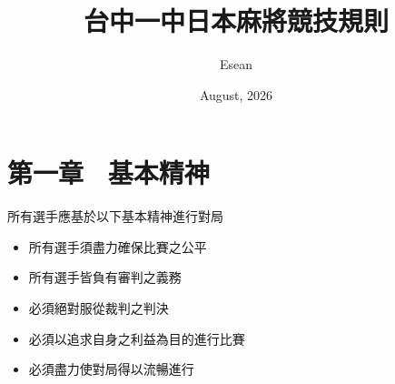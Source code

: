 \documentclass[a4paper,12pt]{article}
\title{台中一中日本麻將競技規則}
\author{Esean}
\date{August, 2026}
\begin{document}
\maketitle
\newpage
\section*{第一章 \ 基本精神}
所有選手應基於以下基本精神進行對局
\begin{itemize}
    \item 所有選手須盡力確保比賽之公平
    \item 所有選手皆負有審判之義務
    \item 必須絕對服從裁判之判決
    \item 必須以追求自身之利益為目的進行比賽
    \item 必須盡力使對局得以流暢進行
\end{itemize}
\end{document}
